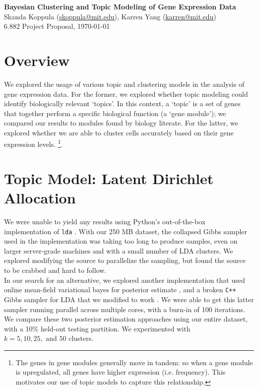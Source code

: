 \documentclass[11pt]{article}
\begin{document}
\begin{centering}
\Large
    \textbf{Bayesian Clustering and Topic Modeling of Gene Expression Data}  \\
    \vspace{2mm}
    \normalsize
    Skanda Koppula (\url{skoppula@mit.edu}), Karren Yang (\url{karren@mit.edu}) \\
    \vspace{2mm}
    \normalsize
    6.882 Project Proposal, \today \\
\end{centering}
\vspace{5mm}

\section{Overview}

We explored the usage of various topic and clustering models in the analysis of gene expression data. For the former, we explored whether topic modeling could identify biologically relevant `topics'. In this context, a `topic' is a set of genes that together perform a specific biological function (a `gene module'); we compared our results to modules found by biology literate. For the latter, we explored whether we are able to cluster cells
accurately based on their gene expression levels. \footnote{The genes in gene modules generally move in tandem: so when a gene module is upregulated, all genes have higher expression (i.e. frequency). This motivates our use of topic models to capture this relationship.}.

\section{Topic Model: Latent Dirichlet Allocation}

We were unable to yield any results using Python's out-of-the-box implementation of \texttt{lda} \cite{lda}. With our 250 MB dataset, the collapsed Gibbs sampler used in the implementation was taking too long to produce samples, even on larger server-grade machines and with a small number of LDA clusters. We explored modifying the source to parallelize the sampling, but found the source to be crabbed and hard to follow. \\

In our search for an alternative, we explored another implementation that used online mean-field variational bayes for posterior estimate \cite{ovb, online}, and a broken \texttt{C++} Gibbs sampler for LDA that we modified to work \cite{plda}. We were able to get this latter sampler running parallel across multiple cores, with a burn-in of 100 iterations. We compare these two posterior estimation approaches using our entire dataset, with a 10\% held-out testing partition. We experimented with
$k=5,10,25,\text{ and } 50$ clusters. \\
\end{document}
